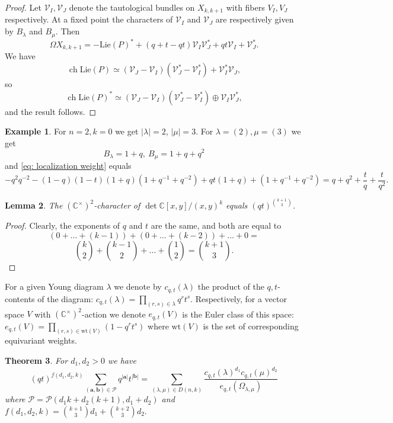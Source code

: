 \documentclass[12pt]{amsart}
\newcommand{\C}{\mathbb{C}}
\newcommand{\CV}{\mathcal{V}}
\DeclareMathOperator{\ch}{ch}
\newcommand{\aaa}{\mathbf{a}}
\newcommand{\bbb}{\mathbf{b}}
\numberwithin{equation}{section}
\newtheorem{theorem}{Theorem}[section]
\newtheorem{lemma}[theorem]{Lemma}
\theoremstyle{definition}
\newtheorem{example}[theorem]{Example}
\begin{document}
\begin{proof}
Let $\CV_I,\CV_J$ denote the tautological bundles on $X_{k,k+1}$ with fibers $V_I,V_J$ respectively. At a fixed point the characters of $\CV_I$ and $\CV_J$ are respectively given by $B_{\lambda}$ and $B_{\mu}$. 
Then
$$
\Omega X_{k,k+1}=-\mathrm{Lie}(P)^{\ast}+
 (q+t-qt)\CV_I\CV_J^{\ast}+qt\CV_I+\CV_J^{\ast}.
$$
We have 
$$
\ch\mathrm{Lie}(P)\simeq  (\CV_J-\CV_I)(\CV_J^{\ast}-\CV_I^{\ast})+ \CV_I^{\ast}\CV_J,
$$
so
$$
\ch\mathrm{Lie}(P)^{\ast}\simeq (\CV_J-\CV_I)(\CV_J^{\ast}-\CV_I^{\ast})\oplus \CV_I\CV_J^{\ast},
$$
and the result follows. 
\end{proof}

\begin{example}
For $n=2, k=0$ we get $|\lambda|=2$, $|\mu|=3$. For $\lambda=(2),\mu=(3)$ we get
$$
B_{\lambda}=1+q,\ B_{\mu}=1+q+q^2
$$
and \eqref{eq: localization weight} equals
$$
-q^2q^{-2}-(1-q)(1-t)(1+q)(1+q^{-1}+q^{-2})+qt(1+q)+(1+q^{-1}+q^{-2})=q+q^2+\frac{t}{q}+\frac{t}{q^2}.
$$
\end{example}

\begin{lemma}
\label{lem: triangular correction}
The $(\C^{\times})^2$-character of $\det\C[x,y]/(x,y)^k$ equals $(qt)^{\binom{k+1}{3}}$.
\end{lemma}

\begin{proof}
Clearly, the exponents of $q$ and $t$ are the same, and both are equal to
$$
(0+\ldots+(k-1))+(0+\ldots+(k-2))+\ldots+0=$$
$$
\binom{k}{2}+\binom{k-1}{2}+\ldots+\binom{1}{2}=\binom{k+1}{3}.
$$
\end{proof}

For a given Young diagram \(\lambda\) we denote by \(c_{q,t}(\lambda)\) the product of the \(q,t\)-contents of the diagram:
\(c_{q,t}(\lambda)=\prod_{(r,s)\in \lambda } q^rt^s\). Respectively,  for a vector space \(V\) with
\((\C^\times)^2\)-action  we denote \(e_{q,t}(V)\) is the Euler class of this space:
 \(e_{q,t}(V)=\prod_{(r,s)\in \mathrm{wt}(V)}(1-q^rt^s)\) where \(\mathrm{wt}(V)\) is the set of corresponding equivariant weights.
\begin{theorem}\label{thm:localization-f} For \(d_1,d_2>0\) %
  we have
  \[(qt)^{f(d_1,d_2,k)}\sum_{(\aaa,\bbb)\in \mathcal{P}} q^{|\aaa|}t^{|\bbb|}=\sum_{(\lambda,\mu)\in D(n,k)}\frac{c_{q,t}(\lambda)^{d_1}c_{q,t}(\mu)^{d_2}}{e_{q,t}(\Omega_{\lambda,\mu})}\]
  where \(\mathcal{P}=\mathcal{P}(d_1k+d_2(k+1),d_1+d_2)\) and \(f(d_1,d_2,k)=\binom{k+1}{3}d_1+\binom{k+2}{3}d_2.\)
\end{theorem}
\end{document}
